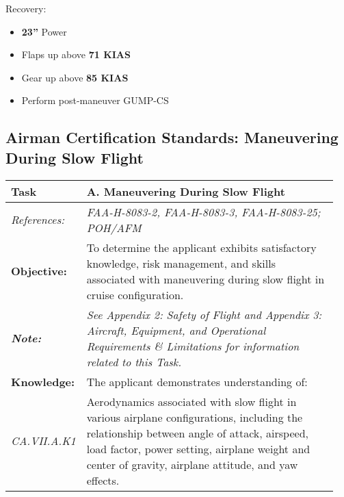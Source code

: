 Recovery:
\begin{itemize}[label={}]
\item \textbf{23''} Power
\item Flaps up above \textbf{71 KIAS}
\item Gear up above \textbf{85 KIAS}
\item Perform post-maneuver GUMP-CS
\end{itemize}

\newpage
\subsection{Airman Certification Standards: Maneuvering During Slow Flight}
\begin{table}[H]
\begin{tabular}%
  {>{\raggedleft\arraybackslash}p{0.15\linewidth}%
   >{\raggedright\arraybackslash}p{0.8\linewidth}%
  }
\textbf{Task}             & \textbf{A. Maneuvering During Slow Flight}                                                                                                                                                                                                        \\ \hline
\textit{References:}      & \textit{FAA-H-8083-2, FAA-H-8083-3, FAA-H-8083-25; POH/AFM}                                                                                                                                                                                       \\
\textbf{Objective:}       & To determine the applicant exhibits satisfactory knowledge, risk management, and skills associated with maneuvering during slow flight in cruise configuration.                                                                                   \\
\textit{\textbf{Note:}}   & \textit{See Appendix 2: Safety of Flight and Appendix 3: Aircraft, Equipment, and Operational Requirements \& Limitations for information related to this Task.}                                                                                  \\ \hline
\textbf{Knowledge:}       & The applicant demonstrates understanding of:                                                                                                                                                                                                      \\
\textit{CA.VII.A.K1}      & Aerodynamics associated with slow flight in various airplane configurations, including the relationship between angle of attack, airspeed, load factor, power setting, airplane weight and center of gravity, airplane attitude, and yaw effects. \\ \hline

\end{tabular}
\end{table}

